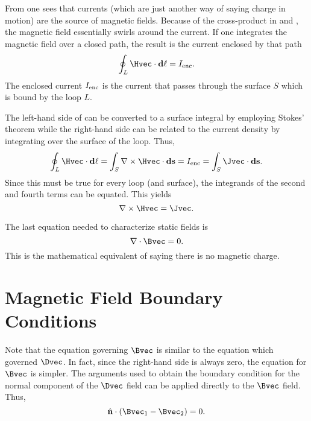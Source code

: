 From  one sees that currents (which are just
another way of saying charge in motion) are the source of magnetic
fields.  Because of the cross-product in  and
, the magnetic field essentially swirls around
the current.  If one integrates the magnetic field over a closed path,
the result is the current enclosed by that path
\begin{equation}
  \oint_L \Hvec \cdot \mathbf{d\ell} = I_{\mbox{\scriptsize enc}}.
  \label{eq:hIntegral}
\end{equation}
The enclosed current $I_{\mbox{\scriptsize enc}}$ is the current that
passes through the surface $S$ which is bound by the loop $L$.

The left-hand side of  can be converted to a
surface integral by employing Stokes' theorem while the right-hand
side can be related to the current density by integrating over the
surface of the loop.  Thus,
\begin{equation}
  \oint_L \Hvec\cdot \mathbf{d\ell} = 
  \int_S \nabla\times\Hvec \cdot \mathbf{ds} =
  I_{\mbox{\scriptsize enc}} =
  \int_S \Jvec \cdot \mathbf{ds}.
  \label{eq:hIntegralII}
\end{equation}
Since this must be true for every loop (and surface), the integrands
of the second and fourth terms can be equated.  This yields
\begin{equation}
  \nabla\times\Hvec = \Jvec.
\end{equation}

The last equation needed to characterize static fields is
\begin{equation}
  \nabla\cdot\Bvec=0.
\end{equation}
This is the mathematical equivalent of saying there is no magnetic
charge.

\section{Magnetic Field Boundary Conditions}

Note that the equation governing $\Bvec$ is similar to the equation
which governed $\Dvec$.  In fact, since the right-hand side is always
zero, the equation for $\Bvec$ is simpler.  The arguments used to
obtain the boundary condition for the normal component of the $\Dvec$
field can be applied directly to the $\Bvec$ field.  Thus, 
\begin{equation}
 \hat{\mathbf{n}} \cdot(\Bvec_1 - \Bvec_2) = 0.
\end{equation}

